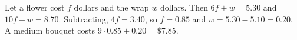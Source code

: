 Let a flower cost $f$ dollars and the wrap $w$ dollars. Then $6f+w=5.30$ and $10f+w=8.70$. Subtracting, $4f=3.40$, so $f=0.85$ and $w=5.30-5.10=0.20$. A medium bouquet costs $9\cdot0.85+0.20=\boxed{\$7.85}$.
